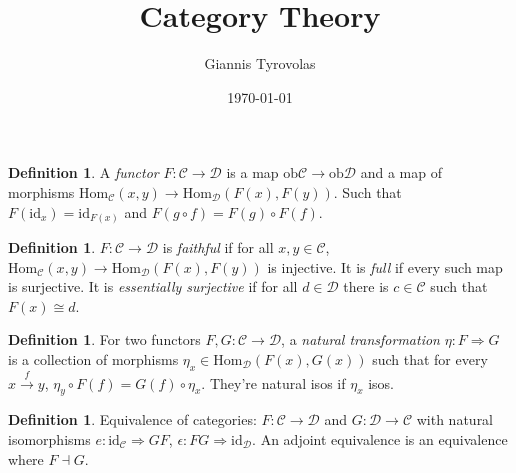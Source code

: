 \documentclass[a4paper,10pt]{article}
\title{Category Theory}
\author{Giannis Tyrovolas}
\date{\today}
\theoremstyle{definition}
\newtheorem{definition}[theorem]{Definition}
\newcommand{\Hom}[3][C]{\mathrm{Hom}_\mathcal{#1}(#2, #3)}
\newcommand{\C}{\mathcal{C}}
\newcommand{\D}{\mathcal{D}}
\newcommand{\id}{\mathrm{id}}
\begin{document}
\begin{definition}
    A \emph{functor} $F \colon \C \longrightarrow \D$ is a map $\mathrm{ob} \C \rightarrow \mathrm{ob} \D$ and a map of morphisms $\Hom[C]{x}{y} \rightarrow \Hom[D]{F(x)}{F(y)}$. Such that $F(\id_x) = \id_{F(x)}$ and $F(g \circ f) = F(g) \circ F(f)$.
\end{definition}

\begin{definition}
    $F \colon \C \rightarrow \D$ is \emph{faithful} if for all $x, y \in \C$, $\Hom{x}{y} \rightarrow \Hom[D]{F(x)}{F(y)}$ is injective.
    It is \emph{full} if every such map is surjective.
    It is \emph{essentially surjective} if for all $d \in \D$ there is $c \in \C$ such that $F(x) \cong d$.
\end{definition}

\begin{definition}
    For two functors $F, G \colon \C \rightarrow \D$, a \emph{natural transformation} $\eta \colon F \Rightarrow G$ is a collection of morphisms $\eta_x \in \Hom[D]{F(x)}{G(x)}$ such that for every $x \xrightarrow{f} y$, $\eta_y \circ F(f) = G(f) \circ \eta_x$. They're natural isos if $\eta_x$ isos.
\end{definition}
\begin{definition}
    Equivalence of categories: $F \colon \C \rightarrow \D$ and $G \colon \D \rightarrow \C$ with natural isomorphisms $e \colon \id_{\C} \Rightarrow GF$, $\epsilon \colon FG \Rightarrow \id_{\D}$. An adjoint equivalence is an equivalence where $F \dashv G$.
\end{definition}
\end{document}
